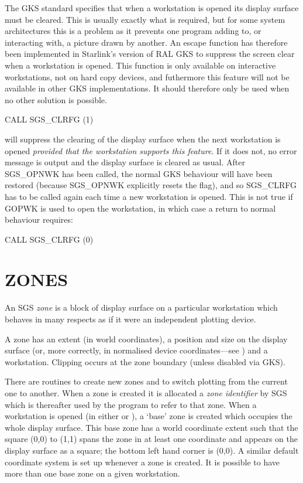\documentclass[11pt]{starlink}
\begin{document}
The GKS standard specifies that when a workstation is opened its display
surface must be cleared. This is usually exactly what is required, but for
some system architectures this is a problem as it prevents one program adding
to, or interacting with, a picture drawn by another. An escape function
has therefore been implemented in Starlink's version of RAL GKS to suppress
the screen clear when a workstation is opened. This function is only available
on interactive workstations, not on hard copy devices, and futhermore this
feature will not be available in other GKS implementations. It should therefore
only be used when no other solution is possible.
\begin{terminalv}
CALL SGS_CLRFG (1)
\end{terminalv}
will suppress the clearing of the display surface when the next workstation is
opened \emph{provided that the workstation supports this feature}.
If it does not,
no error message is output and the display surface is cleared as usual. After
SGS\_OPNWK has been called, the normal GKS behaviour will have been restored
(because SGS\_OPNWK explicitly resets the flag), and so SGS\_CLRFG has to be
called again each time a new workstation is opened. This is not true if GOPWK
is used to open the workstation, in which case a return to
normal behaviour requires:
\begin{terminalv}
CALL SGS_CLRFG (0)
\end{terminalv}

\section {\label{zones}ZONES}

An SGS \emph{zone}\/ is a block of display surface on a particular
workstation which behaves in many respects
as if it were an independent plotting device.

A zone has an extent (in world coordinates), a
position and size on the display surface (or, more correctly,
in normalised device coordinates---see
) and a workstation.
Clipping occurs at the zone boundary (unless disabled via GKS).

There are routines to create new
zones and to switch plotting from the
current one to another.  When
a zone is created it is allocated a \emph{zone identifier}\/ by SGS
which is thereafter used by the program to refer to that
zone.  When a workstation is opened (in either
 or
), a `base' zone is created which occupies the
whole display surface.  This base zone has a world coordinate
extent such that the square (0,0) to (1,1) spans the
zone in
at least one
coordinate and appears on the display surface as
a square;  the bottom left hand corner is (0,0).  A similar
default coordinate system is set
up whenever a zone is created.  It is possible
to have more than one base zone on a given workstation.
\end{document}

